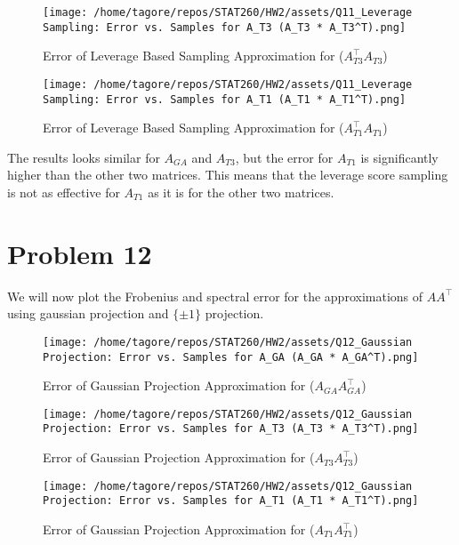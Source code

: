 \documentclass{article}
\begin{document}
\begin{figure}[H]
    \centering
    \texttt{[image: /home/tagore/repos/STAT260/HW2/assets/Q11\_Leverage Sampling: Error vs. Samples for A\_T3 (A\_T3 * A\_T3^T).png]}
    \caption{Error of Leverage Based Sampling Approximation for (\(A_{T3}^\top A_{T3}\))}
    \label{fig:T1_leverage_based_error}
\end{figure}

\begin{figure}[H]
    \centering
    \texttt{[image: /home/tagore/repos/STAT260/HW2/assets/Q11\_Leverage Sampling: Error vs. Samples for A\_T1 (A\_T1 * A\_T1^T).png]}
    \caption{Error of Leverage Based Sampling Approximation for (\(A_{T1}^\top A_{T1}\))}
    \label{fig:T3_leverage_based_error}
\end{figure}

The results looks similar for $A_{GA}$ and $A_{T3}$, but the error for $A_{T1}$ is significantly higher than the other two matrices. 
This means that the leverage score sampling is not as effective for $A_{T1}$ as it is for the other two matrices.


\section*{Problem 12}

We will now plot the Frobenius and spectral error for the approximations of \(A A^\top\) using gaussian projection and $\{\pm 1\}$ projection.
\begin{figure}[H]
    \centering
    \texttt{[image: /home/tagore/repos/STAT260/HW2/assets/Q12\_Gaussian Projection: Error vs. Samples for A\_GA (A\_GA * A\_GA^T).png]}
    \caption{Error of Gaussian Projection Approximation for (\(A_{GA} A_{GA}^\top\))}
    \label{fig:GA_gaussian_projection_error}
\end{figure}
\begin{figure}[H]
    \centering
    \texttt{[image: /home/tagore/repos/STAT260/HW2/assets/Q12\_Gaussian Projection: Error vs. Samples for A\_T3 (A\_T3 * A\_T3^T).png]}
    \caption{Error of Gaussian Projection Approximation for (\(A_{T3} A_{T3}^\top\))}
    \label{fig:T3_gaussian_projection_error}
\end{figure}

\begin{figure}[H]
    \centering
    \texttt{[image: /home/tagore/repos/STAT260/HW2/assets/Q12\_Gaussian Projection: Error vs. Samples for A\_T1 (A\_T1 * A\_T1^T).png]}
    \caption{Error of Gaussian Projection Approximation for (\(A_{T1} A_{T1}^\top\))}
    \label{fig:T1_gaussian_projection_error}
\end{figure}
\end{document}
